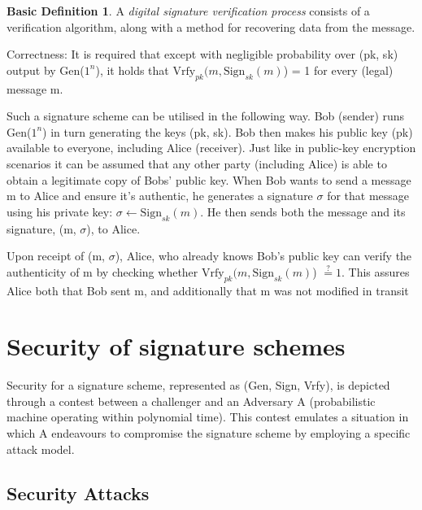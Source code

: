 \documentclass[]{final_report}
\theoremstyle{definition}
\newtheorem{basic}{Basic Definition}
\begin{document}
\begin{basic}
\label{basicDef:vrfy}
A \textit{digital signature verification process} consists of a verification algorithm, along with a method for recovering data from the message.
\end{basic}

Correctness: It is required that except with negligible probability over (pk, sk) output by Gen($1^n$), it holds that $\text{Vrfy}_{pk} (m, \text{Sign}_{sk}(m)$) = 1 for every (legal) message m. 

Such a signature scheme can be utilised in the following way.
Bob (sender) runs Gen($1^n$) in turn generating the keys (pk, sk). Bob then makes his public key (pk) available to everyone, including Alice (receiver). Just like in public-key encryption scenarios it can be assumed that any other party (including Alice) is able to obtain a legitimate copy of Bobs' public key. 
When Bob wants to send a message m to Alice and ensure it's authentic, he generates a signature $\sigma$ for that message using his private key: $\sigma \leftarrow \text{Sign}_{sk}(m)$. He then sends both the message and its signature, (m, $\sigma$), to Alice.

Upon receipt of (m, $\sigma$), Alice, who already knows Bob's public key can verify the authenticity of m by checking whether $\text{Vrfy}_{pk} (m, \text{Sign}_{sk}(m)$) $\stackrel{?}{=} 1$. This assures Alice both that Bob sent m, and additionally that m was not modified in transit

\section{Security of signature schemes}
Security for a signature scheme, represented as (Gen, Sign, Vrfy), is depicted through a contest between a challenger and an Adversary A (probabilistic machine operating within polynomial time). This contest emulates a situation in which A endeavours to compromise the signature scheme by employing a specific attack model. 
\subsection{Security Attacks}
\end{document}
